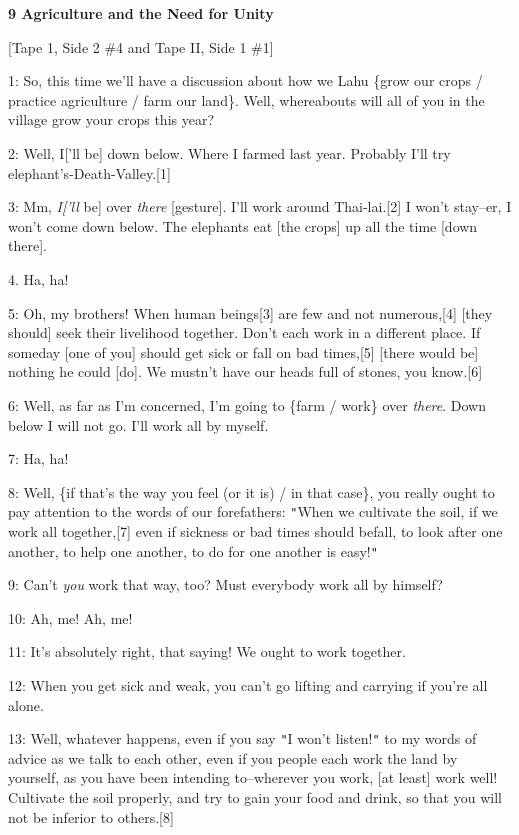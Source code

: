 
\textbf{9 Agriculture and the Need for Unity}

[Tape 1,  Side 2 \#4 and Tape II, Side 1 \#1]

1: So, this time we'll have a discussion about how we Lahu \{grow our crops / practice
agriculture / farm our land\}. Well, whereabouts will all of you in the village
grow your crops this year?

2: Well, I['ll be] down below. Where I farmed last year. Probably I'll try elephant's-Death-Valley.[1]

3: Mm, \textit{I['ll} be] over \textit{there} [gesture]. I'll work around Thai-lai.[2]
I won't stay--er, I won't come down below. The elephants eat [the crops] up all
the time [down there].

4. Ha, ha!

5: Oh, my brothers! When human beings[3] are few and not numerous,[4] [they should]
seek their livelihood together. Don't each work in a different place. If someday
[one of you] should get sick or fall on bad times,[5] [there would be] nothing
he could [do]. We mustn't have our heads full of stones, you know.[6]

6: Well, as far as I'm concerned, I'm going to \{farm / work\} over \textit{there}.
Down below I will not go. I'll work all by myself.

7: Ha, ha!

8: Well, \{if that's the way you feel (or it is) / in that case\}, you really ought
to pay attention to the words of our forefathers: \texttt{"}When we cultivate the
soil, if we work all together,[7] even if sickness or bad times should befall,
to look after one another, to help one another, to do for one another is easy!\texttt{"}


9: Can't \textit{you} work that way, too? Must everybody work all by himself?

10: Ah, me! Ah, me!

11: It's absolutely right, that saying! We ought to work together.

12: When you get sick and weak, you can't go lifting and carrying if you're all
alone.

13: Well, whatever happens, even if you say \texttt{"}I won't listen!\texttt{"}
to my words of advice as we talk to each other, even if you people each work the
land by yourself, as you have been intending to--wherever you work, [at least]
work well! Cultivate the soil properly, and try to gain your food and drink, so
that you will not be inferior to others.[8]

